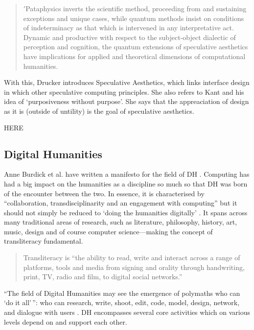 \begin{quotation}
  $'$Pataphysics inverts the scientific method, proceeding from and sustaining exceptions and unique cases, while quantum methods insist on conditions of indeterminacy as that which is intervened in any interpretative act. Dynamic and productive with respect to the subject-object dialectic of perception and cognition, the quantum extensions of speculative aesthetics have implications for applied and theoretical dimensions of computational humanities. 
\end{quotation}

With this, Drucker introduces Speculative Aesthetics, which links interface design in which other speculative computing principles. She also refers to Kant and his idea of `purposiveness without purpose'. She says that the appreaciation of design as it is (outside of untility) is the goal of speculative aesthetics.

HERE
\subsection{Digital Humanities}

Anne Burdick et al. have written a manifesto for the field of \ac{DH} \citeyear{Burdick2012}. Computing has had a big impact on the humanities as a discipline so much so that \ac{DH} was born of the encounter between the two. In essence, it is characterised by ``collaboration, transdisciplinarity and an engagement with computing'' \autocite[p.122]{Burdick2012} but it should not simply be reduced to `doing the humanities digitally' \autocite[p.101]{Burdick2012}. It spans across many traditional areas of research, such as literature, philosophy, history, art, music, design and of course computer science---making the concept of transliteracy fundamental.

\begin{quotation}
  Transliteracy is ``the ability to read, write and interact across a range of platforms, tools and media from signing and orality through handwriting, print, TV, radio and film, to digital social networks.'' 
\end{quotation}

``The field of Digital Humanities may see the emergence of polymaths who can `do it all'\,'': who can research, write, shoot, edit, code, model, design, network, and dialogue with users \autocite[p.15]{Burdick2012}. \ac{DH} encompasses several core activities which on various levels depend on and support each other.

